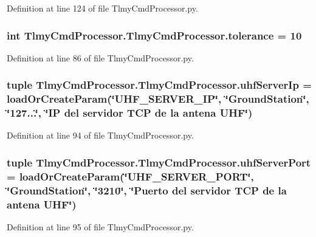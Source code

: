 Definition at line 124 of file Tlmy\+Cmd\+Processor.\+py.

\hypertarget{namespace_tlmy_cmd_processor_1_1_tlmy_cmd_processor_afb50f24734d74f88dacebcac995fd9f4}{}
\subsubsection[{tolerance}]{\setlength{\rightskip}{0pt plus 5cm}int Tlmy\+Cmd\+Processor.\+Tlmy\+Cmd\+Processor.\+tolerance = 10}\label{namespace_tlmy_cmd_processor_1_1_tlmy_cmd_processor_afb50f24734d74f88dacebcac995fd9f4}


Definition at line 86 of file Tlmy\+Cmd\+Processor.\+py.

\hypertarget{namespace_tlmy_cmd_processor_1_1_tlmy_cmd_processor_ad1afaadb14f89dfd6adce55457a89fa4}{}
\subsubsection[{uhf\+Server\+Ip}]{\setlength{\rightskip}{0pt plus 5cm}tuple Tlmy\+Cmd\+Processor.\+Tlmy\+Cmd\+Processor.\+uhf\+Server\+Ip = load\+Or\+Create\+Param(\char`\"{}U\+H\+F\+\_\+\+S\+E\+R\+V\+E\+R\+\_\+\+I\+P\char`\"{}, \char`\"{}Ground\+Station\char`\"{}, \char`\"{}127...\char`\"{}, \char`\"{}I\+P del servidor T\+C\+P de la antena U\+H\+F\char`\"{})}\label{namespace_tlmy_cmd_processor_1_1_tlmy_cmd_processor_ad1afaadb14f89dfd6adce55457a89fa4}


Definition at line 94 of file Tlmy\+Cmd\+Processor.\+py.

\hypertarget{namespace_tlmy_cmd_processor_1_1_tlmy_cmd_processor_abc4f5193ae5293a175c24785f648c36f}{}
\subsubsection[{uhf\+Server\+Port}]{\setlength{\rightskip}{0pt plus 5cm}tuple Tlmy\+Cmd\+Processor.\+Tlmy\+Cmd\+Processor.\+uhf\+Server\+Port = load\+Or\+Create\+Param(\char`\"{}U\+H\+F\+\_\+\+S\+E\+R\+V\+E\+R\+\_\+\+P\+O\+R\+T\char`\"{}, \char`\"{}Ground\+Station\char`\"{}, \char`\"{}3210\char`\"{}, \char`\"{}Puerto del servidor T\+C\+P de la antena U\+H\+F\char`\"{})}\label{namespace_tlmy_cmd_processor_1_1_tlmy_cmd_processor_abc4f5193ae5293a175c24785f648c36f}


Definition at line 95 of file Tlmy\+Cmd\+Processor.\+py.

